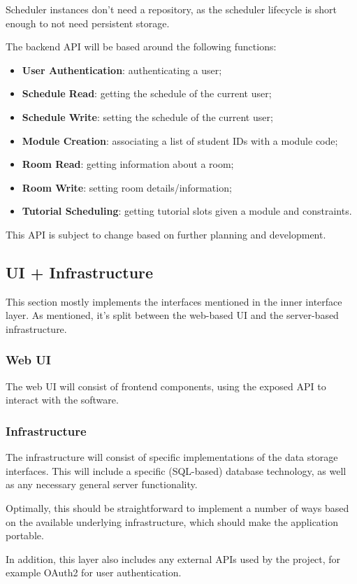 \documentclass[12pt, a4paper]{article}
\begin{document}
Scheduler instances don't need a repository, as the scheduler lifecycle is short enough to not need persistent storage.

The backend API will be based around the following functions:

\begin{itemize}
\item \textbf{User Authentication}: authenticating a user;
\item \textbf{Schedule Read}: getting the schedule of the current user;
\item \textbf{Schedule Write}: setting the schedule of the current user;
\item \textbf{Module Creation}: associating a list of student IDs with a module code;
\item \textbf{Room Read}: getting information about a room;
\item \textbf{Room Write}: setting room details/information;
\item \textbf{Tutorial Scheduling}: getting tutorial slots given a module and constraints.
\end{itemize}

This API is subject to change based on further planning and development.

\subsection{UI + Infrastructure}

This section mostly implements the interfaces mentioned in the inner interface layer.
As mentioned, it's split between the web-based UI and the server-based infrastructure.

\subsubsection{Web UI}

The web UI will consist of frontend components, using the exposed API to interact with the software.

\subsubsection{Infrastructure}

The infrastructure will consist of specific implementations of the data storage interfaces.
This will include a specific (SQL-based) database technology, as well as any necessary general server functionality.

Optimally, this should be straightforward to implement a number of ways based on the available underlying infrastructure, which should make the application portable.

In addition, this layer also includes any external APIs used by the project, for example OAuth2 for user authentication.
\end{document}
